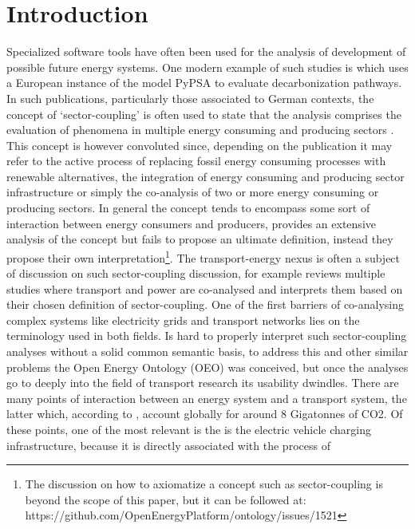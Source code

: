 ﻿\section{Introduction}

Specialized software tools have often been used for the analysis of development
of possible future energy systems. One modern example of such studies is
\cite{Victoria.2022} which uses a European instance of the model PyPSA
\cite{Brown.2018} to evaluate decarbonization pathways. In such publications,
particularly those associated to German contexts, the concept of
`sector-coupling' is often used to state that the analysis comprises the
evaluation of phenomena in multiple energy consuming and producing sectors
\cite{Fridgen.2020}. This concept is however convoluted since, depending on the
publication it may refer to the active process of replacing fossil energy
consuming processes with renewable alternatives, the integration of energy
consuming and producing sector infrastructure or simply the co-analysis of two
or more energy consuming or producing sectors. In general the concept tends to
encompass some sort of interaction between energy consumers and producers,
\cite{Ramsebner.2021} provides an extensive analysis of the concept but fails
to propose an ultimate definition, instead they propose their own
interpretation\footnote{The discussion on how to axiomatize a concept such as
sector-coupling is beyond the scope of this paper, but it can be followed at:
https://github.com/OpenEnergyPlatform/ontology/issues/1521}. The
transport-energy nexus is often a subject of discussion on such sector-coupling
discussion, for example \cite{Robinius.2017} reviews multiple studies where
transport and power are co-analysed and interprets them based on their chosen
definition of sector-coupling. One of the first barriers of co-analysing
complex systems like electricity grids and transport networks lies on the
terminology used in both fields. Is hard to properly interpret such
sector-coupling analyses without a solid common semantic basis, to address this
and other similar problems the Open Energy Ontology (OEO) \cite{Booshehri.2021}
was conceived, but once the analyses go to deeply into the field of transport
research its usability dwindles. There are many points of interaction between
an energy system and a transport system, the latter which, according to
\cite{IEA.2023}, account globally for around 8 Gigatonnes of CO2. Of these
points, one of the most relevant is the is the electric vehicle charging
infrastructure, because it is directly associated with the process of
